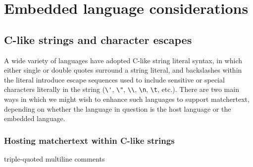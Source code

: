 \section{Embedded language considerations}
\label{sec:embed}

\subsection{C-like strings and character escapes}

A wide variety of languages have adopted C-like string literal syntax,
in which either single or double quotes surround a string literal,
and backslashes within the literal introduce escape sequences
used to include sensitive or special characters literally in the string
(\eg \verb|\'|, \verb|\"|, \verb|\\|, \verb|\n|, \verb|\t|, etc.).
There are two main ways in which we might wish to enhance such languages
to support matchertext,
depending on whether the language in question is the host language
or the embedded language.

\subsubsection{Hosting matchertext within C-like strings}


triple-quoted multiline comments
